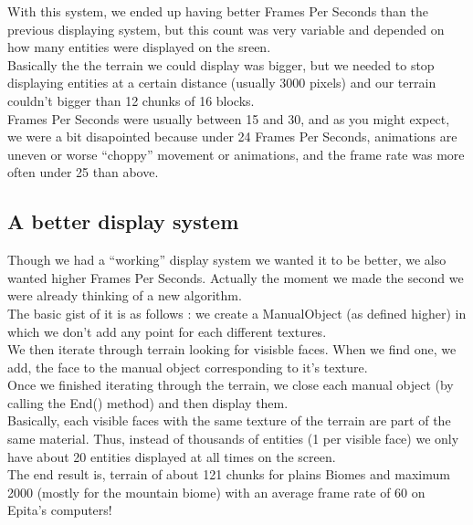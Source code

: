 \documentclass[article]{report}         %
\begin{document}
        With this system, we ended up having better Frames Per Seconds than the previous displaying system, but this count was very variable and depended on how many entities were displayed on the sreen.\\ Basically the the terrain we could display was bigger, but we needed to stop displaying entities at a certain distance (usually 3000 pixels) and our terrain couldn't bigger than 12 chunks of 16 blocks.\\
        Frames Per Seconds were usually between 15 and 30, and as you might expect, we were a bit disapointed because under 24 Frames Per Seconds, animations are uneven or worse ``choppy'' movement or animations, and the frame rate was more often under 25 than above.\\

        \subsection{A better display system}
          Though we had a ``working'' display system we wanted it to be better, we also wanted higher Frames Per Seconds. Actually the moment we made the second we were already thinking of a new algorithm.\\

          The basic gist of it is as follows : we create a ManualObject (as defined higher) in which we don't add any point for each different textures.\\
          We then iterate through terrain looking for visisble faces. When we find one, we add, the face to the manual object corresponding to it's texture.\\
          Once we finished iterating through the terrain, we close each manual object (by calling the End() method) and then display them.\\

          Basically, each visible faces with the same texture of the terrain are part of the same material. Thus, instead of thousands of entities (1 per visible face) we only have about 20 entities displayed at all times on the screen.\\

          The end result is, terrain of about 121 chunks for plains Biomes and maximum 2000 (mostly for the mountain biome) with an average frame rate of 60 on Epita's computers!\\
\end{document}
